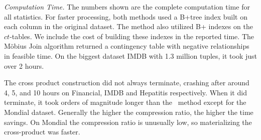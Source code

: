 \documentclass{acm_proc_article-sp}
\newcommand{\ct}{\mathit{ct}}
\begin{document}
{\em Computation Time.} The numbers shown are the complete computation time for all statistics. For faster processing, both methods used a B+tree index built on each column in the original dataset. The \MJ method also utilized B+ indexes on the $\ct$-tables. We include the cost of building these indexes in the reported time. 
%
%
The M\"obius Join algorithm returned a contingency table with negative relationships in feasible time. On the biggest dataset IMDB with 1.3 million tuples, it took just over 2 hours. 

The cross product construction did not always terminate, crashing after around 4, 5, and 10 hours on Financial, IMDB and Hepatitis respectively. When it did terminate, it took orders of magnitude longer than the \MJ ~method except for the Mondial dataset. Generally the higher the compression ratio, the higher the time savings. On Mondial the compression ratio is unusually low, so materializing the cross-product was faster. 
\begin{table}[htbp]
  \centering
{}
  \caption{Number of Sufficient Statistics for Link Analysis On and Off. Extra Time refers to the total \MJ time (Table~\ref{table:cttimes} Col.2) minus the time for computing the positive statistics only.}
  \label{table:link-onoff}%
\end{table}%
\end{document}
